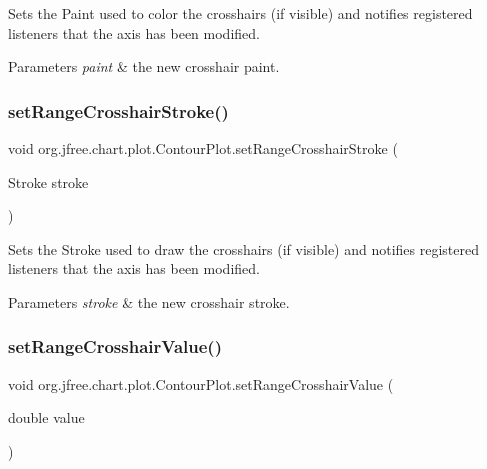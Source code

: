 Sets the Paint used to color the crosshairs (if visible) and notifies registered listeners that the axis has been modified.


\begin{DoxyParams}{Parameters}
{\em paint} & the new crosshair paint. \\
\hline
\end{DoxyParams}
\mbox{\label{classorg_1_1jfree_1_1chart_1_1plot_1_1_contour_plot_a92b5bbd8ae6591b1815571e273504243}} 
\subsubsection{\texorpdfstring{set\+Range\+Crosshair\+Stroke()}{setRangeCrosshairStroke()}}
{\footnotesize\ttfamily void org.\+jfree.\+chart.\+plot.\+Contour\+Plot.\+set\+Range\+Crosshair\+Stroke (\begin{DoxyParamCaption}\item[{Stroke}]{stroke }\end{DoxyParamCaption})}

Sets the Stroke used to draw the crosshairs (if visible) and notifies registered listeners that the axis has been modified.


\begin{DoxyParams}{Parameters}
{\em stroke} & the new crosshair stroke. \\
\hline
\end{DoxyParams}
\mbox{\label{classorg_1_1jfree_1_1chart_1_1plot_1_1_contour_plot_ac68a5bcb1f32b573b0edc4fc2f8ea59b}} 
\subsubsection{\texorpdfstring{set\+Range\+Crosshair\+Value()}{setRangeCrosshairValue()}\hspace{0.1cm}{\footnotesize\ttfamily [1/2]}}
{\footnotesize\ttfamily void org.\+jfree.\+chart.\+plot.\+Contour\+Plot.\+set\+Range\+Crosshair\+Value (\begin{DoxyParamCaption}\item[{double}]{value }\end{DoxyParamCaption})}

